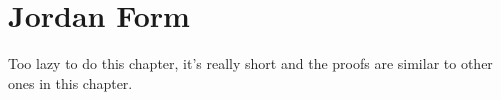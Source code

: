 \section{Jordan Form}

Too lazy to do this chapter, it's really short and the proofs are similar to other ones in this chapter.